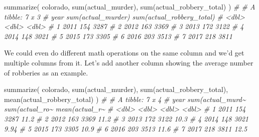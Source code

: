 \documentclass[
  a4paper,
]{krantz}
\makeatletter
\newenvironment{Shaded}{\begin{snugshade}}{\end{snugshade}}
\newcommand{\CommentTok}[1]{\textcolor[rgb]{0.37,0.37,0.37}{\textit{#1}}}
\newcommand{\FunctionTok}[1]{\textcolor[rgb]{0,0,0}{#1}}
\newcommand{\NormalTok}[1]{#1}
\newenvironment{kframe}{%
\medskip{}
\setlength{\fboxsep}{.8em}
 \def\at@end@of@kframe{}%
 \ifinner\ifhmode%
  \def\at@end@of@kframe{\end{minipage}}%
  \begin{minipage}{\columnwidth}%
 \fi\fi%
 \def\FrameCommand##1{\hskip\@totalleftmargin \hskip-\fboxsep
 \colorbox{shadecolor}{##1}\hskip-\fboxsep
     \hskip-\linewidth \hskip-\@totalleftmargin \hskip\columnwidth}%
 \MakeFramed {\advance\hsize-\width
   \@totalleftmargin\z@ \linewidth\hsize
   \@setminipage}}%
 {\par\unskip\endMakeFramed%
 \at@end@of@kframe}
\renewenvironment{Shaded}{\begin{kframe}}{\end{kframe}}
\makeatother
\begin{document}
\begin{Shaded}
\begin{Highlighting}[]
\FunctionTok{summarize}\NormalTok{(}
\NormalTok{  colorado, }\FunctionTok{sum}\NormalTok{(actual\_murder),}
  \FunctionTok{sum}\NormalTok{(actual\_robbery\_total)}
\NormalTok{)}
\CommentTok{\# \# A tibble: 7 x 3}
\CommentTok{\#    year \textasciigrave{}sum(actual\_murder)\textasciigrave{} \textasciigrave{}sum(actual\_robbery\_total)\textasciigrave{}}
\CommentTok{\#   \textless{}dbl\textgreater{}                \textless{}dbl\textgreater{}                       \textless{}dbl\textgreater{}}
\CommentTok{\# 1  2011                  154                        3287}
\CommentTok{\# 2  2012                  163                        3369}
\CommentTok{\# 3  2013                  172                        3122}
\CommentTok{\# 4  2014                  148                        3021}
\CommentTok{\# 5  2015                  173                        3305}
\CommentTok{\# 6  2016                  203                        3513}
\CommentTok{\# 7  2017                  218                        3811}
\end{Highlighting}
\end{Shaded}

We could even do different math operations on the same
column and we'd get multiple columns from it. Let's add
another column showing the average number of robberies as an
example.

\begin{Shaded}
\begin{Highlighting}[]
\FunctionTok{summarize}\NormalTok{(}
\NormalTok{  colorado, }\FunctionTok{sum}\NormalTok{(actual\_murder),}
  \FunctionTok{sum}\NormalTok{(actual\_robbery\_total),}
  \FunctionTok{mean}\NormalTok{(actual\_robbery\_total)}
\NormalTok{)}
\CommentTok{\# \# A tibble: 7 x 4}
\CommentTok{\#    year \textasciigrave{}sum(actual\_murd\textasciitilde{}\textasciigrave{} \textasciigrave{}sum(actual\_ro\textasciitilde{}\textasciigrave{} \textasciigrave{}mean(actual\_r\textasciitilde{}\textasciigrave{}}
\CommentTok{\#   \textless{}dbl\textgreater{}              \textless{}dbl\textgreater{}            \textless{}dbl\textgreater{}            \textless{}dbl\textgreater{}}
\CommentTok{\# 1  2011                154             3287            11.2 }
\CommentTok{\# 2  2012                163             3369            11.2 }
\CommentTok{\# 3  2013                172             3122            10.3 }
\CommentTok{\# 4  2014                148             3021             9.94}
\CommentTok{\# 5  2015                173             3305            10.9 }
\CommentTok{\# 6  2016                203             3513            11.6 }
\CommentTok{\# 7  2017                218             3811            12.5}
\end{Highlighting}
\end{Shaded}
\end{document}
